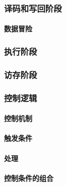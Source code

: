 \subsubsection{译码和写回阶段}
\paragraph{数据冒险}
\subsubsection{执行阶段}
\subsubsection{访存阶段}

\subsubsection{控制逻辑}
\paragraph{控制机制}
\paragraph{触发条件}
\paragraph{处理}
\paragraph{控制条件的组合}














\newpage